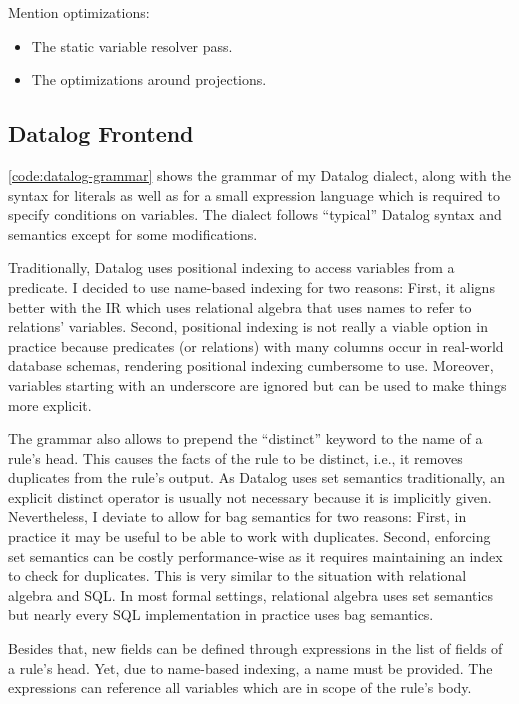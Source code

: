 Mention optimizations:
\begin{itemize}
	\item The static variable resolver pass.
	\item The optimizations around projections.
\end{itemize}

\subsection{Datalog Frontend}\label{sec:datalog-frontend}

\ref{code:datalog-grammar} shows the grammar of my Datalog dialect,
along with the syntax for literals as well as for a small expression language
which is required to specify conditions on variables.
The dialect follows ``typical'' Datalog syntax and semantics
except for some modifications.

Traditionally, Datalog uses positional indexing to access variables from a
predicate. I decided to use name-based indexing for two reasons:
First, it aligns better with the \ac{IR} which uses relational algebra
that uses names to refer to relations' variables.
Second, positional indexing is not really a viable option in practice because
predicates (or relations) with many columns occur in real-world
database schemas, rendering positional indexing cumbersome to use.
Moreover, variables starting with an underscore are ignored but can be used
to make things more explicit.

The grammar also allows to prepend the ``distinct'' keyword to the name
of a rule's head.
This causes the facts of the rule to be distinct, i.e., it removes duplicates
from the rule's output.
As Datalog uses set semantics traditionally, an explicit distinct operator
is usually not necessary because it is implicitly given.
Nevertheless, I deviate to allow for bag semantics for two reasons:
First, in practice it may be useful to be able to work with duplicates.
Second, enforcing set semantics can be costly performance-wise
as it requires maintaining an index to check for duplicates.
This is very similar to the situation with relational algebra and SQL.
In most formal settings, relational algebra uses set semantics but nearly
every SQL implementation in practice uses bag semantics.

Besides that, new fields can be defined through expressions in the list of fields
of a rule's head.
Yet, due to name-based indexing, a name must be provided.
The expressions can reference all variables which are in scope of the rule's body.

